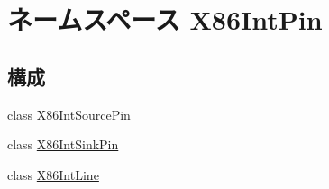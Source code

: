 \hypertarget{namespaceX86IntPin}{
\section{ネームスペース X86IntPin}
\label{namespaceX86IntPin}
}
\subsection*{構成}
\begin{DoxyCompactItemize}
\item 
class \hyperlink{classX86IntPin_1_1X86IntSourcePin}{X86IntSourcePin}
\item 
class \hyperlink{classX86IntPin_1_1X86IntSinkPin}{X86IntSinkPin}
\item 
class \hyperlink{classX86IntPin_1_1X86IntLine}{X86IntLine}
\end{DoxyCompactItemize}
